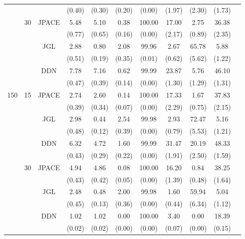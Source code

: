 \documentclass[useAMS,usenatbib,referee]{bio}
\begin{document}
{{\begin{table}[htb!]
{\begin{tabular}{||c|c|c||c|c|c|c|c|c|c||c}
 & & & (0.40) & (0.30) & (0.20) & (0.00) & (1.97) & (2.30) & (1.73) \\\cline{2-10} 
  &\multirow{6}{*}{30}  & \multirow{2}{*}{JPACE} &5.48 & 5.10 & 0.38 & 100.00 & 17.00 & 2.75 & 36.38 \\ 
& & & (0.77) & (0.65) & (0.16) & (0.00) & (2.17) & (0.89) & (2.35) \\ \cline{3-10} 
& & \multirow{2}{*}{JGL} & 2.88 & 0.80 & 2.08 & 99.96 & 2.67 & 65.78 & 5.88 \\ 
 & & & (0.51) & (0.19) & (0.35) & (0.01) & (0.62) & (5.62) & (1.22) \\ \cline{3-10} 
& & \multirow{2}{*}{DDN} & 7.78 & 7.16 & 0.62 & 99.99 & 23.87 & 5.76 & 46.10 \\ 
 & & & (0.47) & (0.39) & (0.14) & (0.00) & (1.30) & (1.29) & (1.31) \\\cline{1-10} 
\multirow{12}{*}{150}  &\multirow{6}{*}{15}  & \multirow{2}{*}{JPACE} &2.74 & 2.60 & 0.14 & 100.00 & 17.33 & 1.67 & 37.83 \\ 
& & & (0.39) & (0.34) & (0.07) & (0.00) & (2.29) & (0.75) & (2.15) \\ \cline{3-10} 
& & \multirow{2}{*}{JGL} & 2.98 & 0.44 & 2.54 & 99.98 & 2.93 & 72.47 & 5.16 \\ 
 & & & (0.48) & (0.12) & (0.39) & (0.00) & (0.79) & (5.53) & (1.21) \\ \cline{3-10} 
& & \multirow{2}{*}{DDN} & 6.32 & 4.72 & 1.60 & 99.99 & 31.47 & 20.19 & 48.33 \\ 
 & & & (0.43) & (0.29) & (0.22) & (0.00) & (1.91) & (2.50) & (1.59) \\\cline{2-10} 
  &\multirow{6}{*}{30}  & \multirow{2}{*}{JPACE} &4.94 & 4.86 & 0.08 & 100.00 & 16.20 & 0.84 & 38.25 \\ 
& & & (0.43) & (0.42) & (0.05) & (0.00) & (1.39) & (0.48) & (1.64) \\ \cline{3-10} 
& & \multirow{2}{*}{JGL} & 2.48 & 0.48 & 2.00 & 99.98 & 1.60 & 59.94 & 5.04 \\ 
 & & & (0.45) & (0.13) & (0.36) & (0.00) & (0.44) & (6.34) & (1.12) \\ \cline{3-10} 
& & \multirow{2}{*}{DDN} & 1.02 & 1.02 & 0.00 & 100.00 & 3.40 & 0.00 & 18.39 \\ 
 & & & (0.02) & (0.02) & (0.00) & (0.00) & (0.07) & (0.00) & (0.15) \\\cline{1-10} 
\end{tabular}
}
\end{table}



}}
\end{document}
